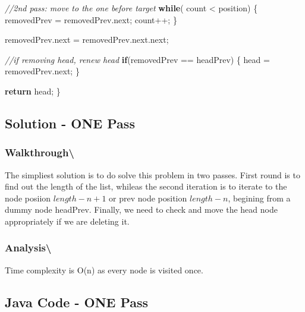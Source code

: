 \documentclass[]{book}
\newenvironment{Shaded}{\begin{snugshade}}{\end{snugshade}}
\newcommand{\CommentTok}[1]{\textcolor[rgb]{0.56,0.35,0.01}{\textit{#1}}}
\newcommand{\FunctionTok}[1]{\textcolor[rgb]{0.00,0.00,0.00}{#1}}
\newcommand{\KeywordTok}[1]{\textcolor[rgb]{0.13,0.29,0.53}{\textbf{#1}}}
\newcommand{\NormalTok}[1]{#1}
\begin{document}
\begin{Shaded}
\begin{Highlighting}[]
    \CommentTok{//2nd pass: move to the one before target}
    \KeywordTok{while}\NormalTok{( count < position) \{}
\NormalTok{        removedPrev = removedPrev.}\FunctionTok{next}\NormalTok{;}
\NormalTok{        count++;}
\NormalTok{    \}}

\NormalTok{    removedPrev.}\FunctionTok{next}\NormalTok{ = removedPrev.}\FunctionTok{next}\NormalTok{.}\FunctionTok{next}\NormalTok{;}

    \CommentTok{//if removing head, renew head}
    \KeywordTok{if}\NormalTok{(removedPrev == headPrev) \{}
\NormalTok{        head = removedPrev.}\FunctionTok{next}\NormalTok{;}
\NormalTok{    \}}


    \KeywordTok{return}\NormalTok{ head;}
\NormalTok{\}}
\end{Highlighting}
\end{Shaded}

\hypertarget{solution---one-pass}{%
\subsection{Solution - ONE Pass}\label{solution---one-pass}}

\hypertarget{walkthrough-114}{%
\subsubsection{Walkthrough\textbackslash{}}\label{walkthrough-114}}

The simpliest solution is to do solve this problem in two passes. First round is to find out the length of the list,
whileas the second iteration is to iterate to the node posiion \(length -n + 1\) or prev node position \(length - n\),
begining from a dummy node headPrev. Finally, we need to check and move the head node appropriately if we are deleting
it.

\hypertarget{analysis-121}{%
\subsubsection{Analysis\textbackslash{}}\label{analysis-121}}

Time complexity is O(n) as every node is visited once.

\hypertarget{java-code---one-pass}{%
\subsection{Java Code - ONE Pass}\label{java-code---one-pass}}
\end{document}
